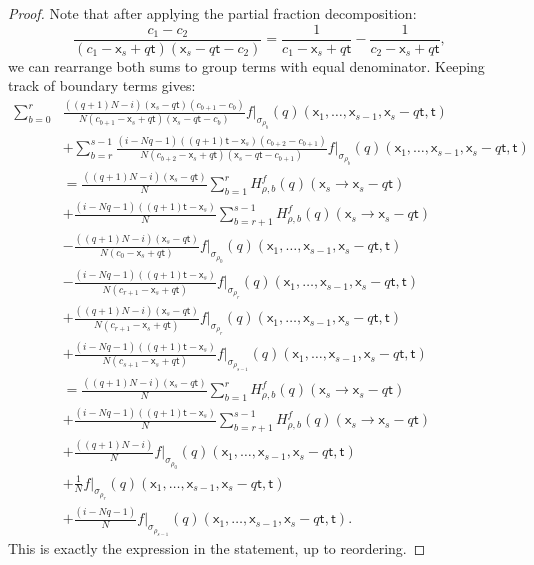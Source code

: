 \documentclass[11pt]{article}
\theoremstyle{definition}
\begin{document}
\begin{proof}
	Note that after applying the partial fraction decomposition:
	$$\frac{c_1-c_2}{(c_1-\mathsf{x}_s+q\mathsf{t})(\mathsf{x}_s-q\mathsf{t}-c_2)}=\frac{1}{c_1-\mathsf{x}_s+q\mathsf{t}}-\frac{1}{c_2-\mathsf{x}_s+q\mathsf{t}},$$
	we can rearrange both sums to group terms with equal denominator.
	Keeping track of boundary terms gives:
    {\allowdisplaybreaks
	\begin{align*}
		\sum_{b=0}^{r}&\frac{((q+1)N-i)(\mathsf{x}_s-q\mathsf{t})(c_{b+1}-c_{b})}{N(c_{b+1}-\mathsf{x}_s+q\mathsf{t})(\mathsf{x}_s-q\mathsf{t}-c_{b})}f|_{\sigma_{\rho_b}}(q)(\mathsf{x}_1,\dots,\mathsf{x}_{s-1},\mathsf{x}_s-q\mathsf{t},\mathsf{t})\\
														&+\sum_{b=r}^{s-1}\frac{(i-Nq-1)((q+1)\mathsf{t}-\mathsf{x}_s)(c_{b+2}-c_{b+1})}{N(c_{b+2}-\mathsf{x}_s+q\mathsf{t})(\mathsf{x}_s-q\mathsf{t}-c_{b+1})}f|_{\sigma_{\rho_{b}}}(q)(\mathsf{x}_1,\dots,\mathsf{x}_{s-1},\mathsf{x}_s-q\mathsf{t},\mathsf{t})\\
														&=\frac{((q+1)N-i)(\mathsf{x}_s-q\mathsf{t})}{N}\sum_{b=1}^{r}H_{\rho,b}^{f}(q)(\mathsf{x}_s\to \mathsf{x}_s-q\mathsf{t})\\
														&+\frac{(i-Nq-1)((q+1)\mathsf{t}-\mathsf{x}_s)}{N}\sum_{b=r+1}^{s-1}H_{\rho,b}^{f}(q)(\mathsf{x}_s\to \mathsf{x}_s-q\mathsf{t})\\
														&-\frac{((q+1)N-i)(\mathsf{x}_s-q\mathsf{t})}{N(c_0-\mathsf{x}_s+q\mathsf{t})}f|_{\sigma_{\rho_0}}(q)(\mathsf{x}_1,\dots,\mathsf{x}_{s-1},\mathsf{x}_s-q\mathsf{t},\mathsf{t})\\
														&-\frac{(i-Nq-1)((q+1)\mathsf{t}-\mathsf{x}_s)}{N(c_{r+1}-\mathsf{x}_s+q\mathsf{t})}f|_{\sigma_{\rho_{r}}}(q)(\mathsf{x}_1,\dots,\mathsf{x}_{s-1},\mathsf{x}_s-q\mathsf{t},\mathsf{t})\\
														&+\frac{((q+1)N-i)(\mathsf{x}_s-q\mathsf{t})}{N(c_{r+1}-\mathsf{x}_s+q\mathsf{t})}f|_{\sigma_{\rho_r}}(q)(\mathsf{x}_1,\dots,\mathsf{x}_{s-1},\mathsf{x}_s-q\mathsf{t},\mathsf{t})\\
														&+\frac{(i-Nq-1)((q+1)\mathsf{t}-\mathsf{x}_s)}{N(c_{s+1}-\mathsf{x}_s+q\mathsf{t})}f|_{\sigma_{\rho_{s-1}}}(q)(\mathsf{x}_1,\dots,\mathsf{x}_{s-1},\mathsf{x}_s-q\mathsf{t},\mathsf{t})\\
														&=\frac{((q+1)N-i)(\mathsf{x}_s-q\mathsf{t})}{N}\sum_{b=1}^{r}H_{\rho,b}^{f}(q)(\mathsf{x}_s\to \mathsf{x}_s-q\mathsf{t})\\
														&+\frac{(i-Nq-1)((q+1)\mathsf{t}-\mathsf{x}_s)}{N}\sum_{b=r+1}^{s-1}H_{\rho,b}^{f}(q)(\mathsf{x}_s\to \mathsf{x}_s-q\mathsf{t})\\
														&+\frac{((q+1)N-i)}{N}f|_{\sigma_{\rho_0}}(q)(\mathsf{x}_1,\dots,\mathsf{x}_{s-1},\mathsf{x}_s-q\mathsf{t},\mathsf{t})\\
														&+\frac{1}{N}f|_{\sigma_{\rho_r}}(q)(\mathsf{x}_1,\dots,\mathsf{x}_{s-1},\mathsf{x}_s-q\mathsf{t},\mathsf{t})\\
														&+\frac{(i-Nq-1)}{N}f|_{\sigma_{\rho_{s-1}}}(q)(\mathsf{x}_1,\dots,\mathsf{x}_{s-1},\mathsf{x}_s-q\mathsf{t},\mathsf{t}).
		\end{align*}}
		This is exactly the expression in the statement, up to reordering.
\end{proof}
\end{document}

